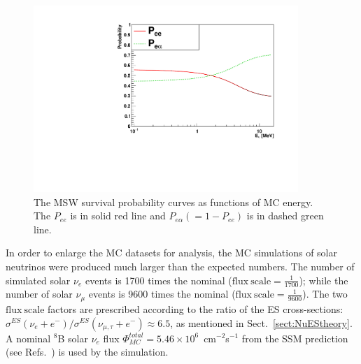 \begin{figure}[!htb]
	\centering
	\includegraphics[width=10cm]{PSelmaa_bs05op.pdf}
	\caption[The MSW survival probability curves as functions of MC energies.]{The MSW survival probability curves as functions of MC energy. The $P_{ee}$ is in solid red line and $P_{e\alpha}(=1-P_{ee})$ is in dashed green line.	\label{fig:pselmaa_curves}}
\end{figure}

In order to enlarge the MC datasets for analysis, the MC simulations of solar neutrinos were produced much larger than the expected numbers. The number of simulated solar $\nu_e$ events is 1700 times the nominal ($\mathrm{flux~scale} = \frac{1}{1700}$); while the number of solar $\nu_\mu$ events is 9600 times the nominal ($\mathrm{flux~scale}=\frac{1}{9600}$). The two $\mathrm{flux~scale}$ factors are prescribed according to the ratio of the ES cross-sections: $\sigma^{ES}(\nu_{e}+e^-)/\sigma^{ES}(\nu_{\mu,\tau}+e^-)\approx 6.5$, as mentioned in Sect.~\ref{sect:NuEStheory}. A nominal $^8$B solar $\nu_e$ flux $\Phi^{total}_{MC}=5.46\times 10^6$~cm$^{-2}$s$^{-1}$ from the SSM prediction (see Refs.~\cite{pdg2020,vinyoles2017new}) is used by the simulation.

